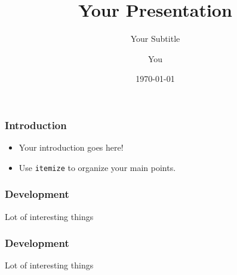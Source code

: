 \documentclass[aspectratio=169]{beamer}              %
\title{Your Presentation}
\subtitle{Your Subtitle}
\author{You}
\institute{Where You're From}
\date{\today}
\begin{document}
\begin{frame}
  \titlepage
\end{frame}

\begin{frame}
    \frametitle{Introduction}

\begin{itemize}
  \item Your introduction goes here!
  \item Use \texttt{itemize} to organize your main points.
\end{itemize}

\end{frame}


\begin{frame}
    \frametitle{Development}

    Lot of interesting things

\end{frame}


\begin{frame}
    \frametitle{Development}

    Lot of interesting things

\end{frame}
\end{document}
